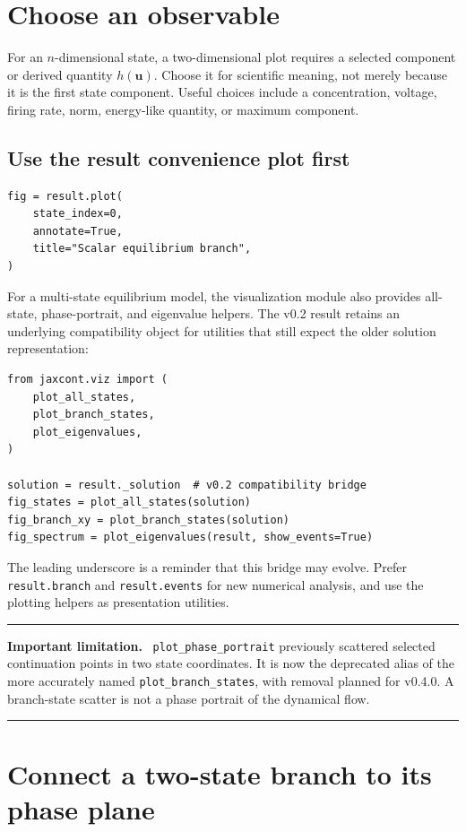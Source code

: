 \documentclass[11pt,oneside]{book}
\newcommand{\state}{\bm{u}}
\newenvironment{warningbox}
  {\par\medskip\noindent\begin{minipage}{\textwidth}
   \color{JaxRed}\rule{\textwidth}{0.8pt}\par
   \textbf{Important limitation.}\ \color{black}}
  {\par\color{JaxRed}\rule{\textwidth}{0.8pt}
   \end{minipage}\par\medskip}
\begin{document}
\section{Choose an observable}

For an $n$-dimensional state, a two-dimensional plot requires a selected
component or derived quantity $h(\state)$. Choose it for scientific meaning,
not merely because it is the first state component. Useful choices include a
concentration, voltage, firing rate, norm, energy-like quantity, or maximum
component.

\subsection{Use the result convenience plot first}

\begin{lstlisting}
fig = result.plot(
    state_index=0,
    annotate=True,
    title="Scalar equilibrium branch",
)
\end{lstlisting}

For a multi-state equilibrium model, the visualization module also provides
all-state, phase-portrait, and eigenvalue helpers. The v0.2 result retains an
underlying compatibility object for utilities that still expect the older
solution representation:

\begin{lstlisting}
from jaxcont.viz import (
    plot_all_states,
    plot_branch_states,
    plot_eigenvalues,
)

solution = result._solution  # v0.2 compatibility bridge
fig_states = plot_all_states(solution)
fig_branch_xy = plot_branch_states(solution)
fig_spectrum = plot_eigenvalues(result, show_events=True)
\end{lstlisting}

The leading underscore is a reminder that this bridge may evolve. Prefer
\texttt{result.branch} and \texttt{result.events} for new numerical analysis,
and use the plotting helpers as presentation utilities.

\begin{warningbox}
\texttt{plot\_phase\_portrait} previously scattered selected continuation
points in two state coordinates. It is now the deprecated alias of the more
accurately named \texttt{plot\_branch\_states}, with removal planned for
v0.4.0. A branch-state scatter is not a phase portrait of the dynamical flow.
\end{warningbox}

\section{Connect a two-state branch to its phase plane}
\end{document}

